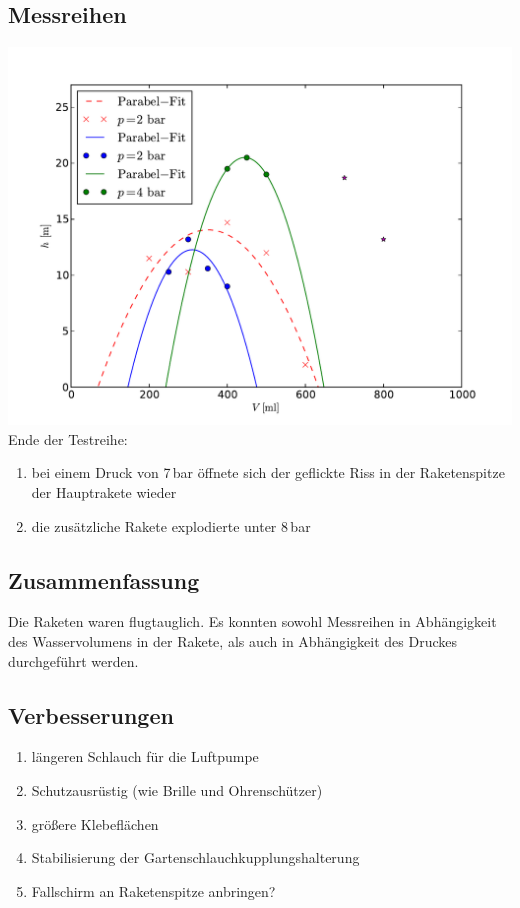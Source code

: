 \subsection{Messreihen}
\includegraphics[width=\textwidth]{figs/rakete/raketenplot.pdf}
Ende der Testreihe:
\begin{enumerate}
\item bei einem Druck von 7\,bar öffnete sich der geflickte Riss in der Raketenspitze der Hauptrakete wieder
\item die zusätzliche Rakete explodierte unter 8\,bar
\end{enumerate}


\subsection{Zusammenfassung}
Die Raketen waren flugtauglich. Es konnten sowohl Messreihen in Abhängigkeit des Wasservolumens in der Rakete, als auch in Abhängigkeit des Druckes durchgeführt werden. 

\subsection{Verbesserungen}
\begin{enumerate}
\item längeren Schlauch für die Luftpumpe
\item Schutzausrüstig (wie Brille und Ohrenschützer)
\item größere Klebeflächen
\item Stabilisierung der Gartenschlauchkupplungshalterung
\item Fallschirm an Raketenspitze anbringen?
\end{enumerate}

